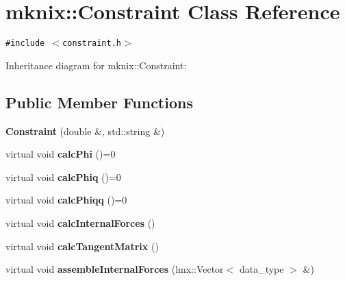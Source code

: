 \hypertarget{classmknix_1_1Constraint}{
\section{mknix::Constraint Class Reference}
\label{classmknix_1_1Constraint}
}
{\tt \#include $<$constraint.h$>$}

Inheritance diagram for mknix::Constraint:\subsection*{Public Member Functions}
\begin{CompactItemize}
\item 
\hypertarget{classmknix_1_1Constraint_093b4ffce363485f60ba251356ff88d1}{
\textbf{Constraint} (double \&, std::string \&)}
\label{classmknix_1_1Constraint_093b4ffce363485f60ba251356ff88d1}

\item 
\hypertarget{classmknix_1_1Constraint_7f2b34d256d5eec54b34b0440b562ec1}{
virtual void \textbf{calcPhi} ()=0}
\label{classmknix_1_1Constraint_7f2b34d256d5eec54b34b0440b562ec1}

\item 
\hypertarget{classmknix_1_1Constraint_b129143960df2b9459e274275608bcf2}{
virtual void \textbf{calcPhiq} ()=0}
\label{classmknix_1_1Constraint_b129143960df2b9459e274275608bcf2}

\item 
\hypertarget{classmknix_1_1Constraint_73ff21573b5e9c4acda789bd5ac46ea8}{
virtual void \textbf{calcPhiqq} ()=0}
\label{classmknix_1_1Constraint_73ff21573b5e9c4acda789bd5ac46ea8}

\item 
\hypertarget{classmknix_1_1Constraint_00ea21a19168bc3cfd3ba97c6a2be31d}{
virtual void \textbf{calcInternalForces} ()}
\label{classmknix_1_1Constraint_00ea21a19168bc3cfd3ba97c6a2be31d}

\item 
\hypertarget{classmknix_1_1Constraint_9b7594c65aa792ffb56d3a598996a969}{
virtual void \textbf{calcTangentMatrix} ()}
\label{classmknix_1_1Constraint_9b7594c65aa792ffb56d3a598996a969}

\item 
\hypertarget{classmknix_1_1Constraint_ca5d35f6ecd8f8f3852c150c7901b890}{
virtual void \textbf{assembleInternalForces} (lmx::Vector$<$ data\_\-type $>$ \&)}
\label{classmknix_1_1Constraint_ca5d35f6ecd8f8f3852c150c7901b890}


\end{CompactItemize}
